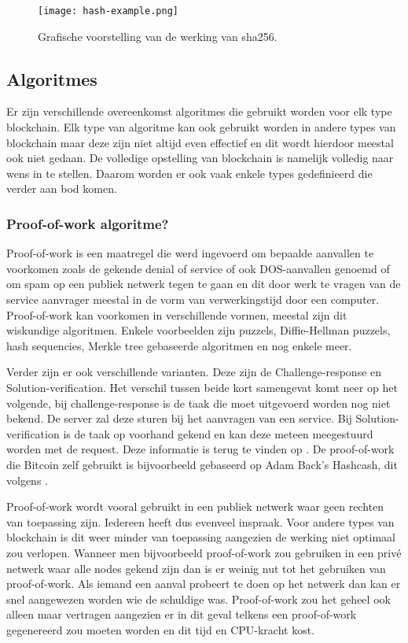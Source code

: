\begin{figure}
	\texttt{[image: hash-example.png]}
	\caption{Grafische voorstelling van de werking van sha256.}
	\label{fig:hash-example}
\end{figure}

\subsection{Algoritmes}
Er zijn verschillende overeenkomst algoritmes die gebruikt worden voor elk type blockchain. Elk type van algoritme kan ook gebruikt worden in andere types van blockchain maar deze zijn niet altijd even effectief en dit wordt hierdoor meestal ook niet gedaan. De volledige opstelling van blockchain is namelijk volledig naar wens in te stellen. Daarom worden er ook vaak enkele types gedefinieerd die verder aan bod komen.

\subsubsection{Proof-of-work algoritme?}
Proof-of-work is een maatregel die werd ingevoerd om bepaalde aanvallen te voorkomen zoals de gekende denial of service of ook DOS-aanvallen genoemd of om spam op een publiek netwerk tegen te gaan en dit door werk te vragen van de service aanvrager meestal in de vorm van verwerkingstijd door een computer. Proof-of-work kan voorkomen in verschillende vormen, meestal zijn dit wiskundige algoritmen. Enkele voorbeelden zijn puzzels, Diffie-Hellman puzzels, hash sequencies, Merkle tree gebaseerde algoritmen en nog enkele meer. 

Verder zijn er ook verschillende varianten. Deze zijn de Challenge-response en Solution-verification. Het verschil tussen beide kort samengevat komt neer op het volgende, bij challenge-response is de taak die moet uitgevoerd worden nog niet bekend. De server zal deze sturen bij het aanvragen van een service. Bij Solution-verification is de taak op voorhand gekend en kan deze meteen meegestuurd worden met de request. Deze informatie is terug te vinden op  \textcite{Mazieres}. De proof-of-work die Bitcoin zelf gebruikt is bijvoorbeeld gebaseerd op Adam Back's Hashcash, dit volgens \textcite{Nakamoto2008}.

Proof-of-work wordt vooral gebruikt in een publiek netwerk waar geen rechten van toepassing zijn. Iedereen heeft dus evenveel inspraak. Voor andere types van blockchain is dit weer minder van toepassing aangezien de werking niet optimaal zou verlopen. Wanneer men bijvoorbeeld proof-of-work zou gebruiken in een privé netwerk waar alle nodes gekend zijn dan is er weinig nut tot het gebruiken van proof-of-work. Als iemand een aanval probeert te doen op het netwerk dan kan er snel aangewezen worden wie de schuldige was. Proof-of-work zou het geheel ook alleen maar vertragen aangezien er in dit geval telkens een proof-of-work gegenereerd zou moeten worden en dit tijd en CPU-kracht kost. 

